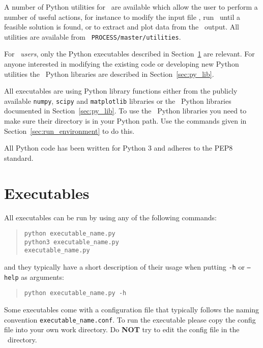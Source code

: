 \label{chap:utilities}

A number of Python utilities for \process\ are available which allow the user
to perform a number of useful actions, for instance to modify the
input file \indat, run \process\ until a feasible solution is found, or to
extract and plot data from the \process\ output. All utilities are available
from \texttt{~PROCESS/master/utilities}.

For \process\ \textit{users}, only the Python executables described in
Section~\ref{sec:py_exec} are relevant. For anyone interested in modifying the
existing code or developing new Python utilities the \process\ Python
libraries are described in Section~\ref{sec:py_lib}.

All executables are using Python library functions either from the publicly
available \texttt{numpy}, \texttt{scipy} and \texttt{matplotlib} libraries or
the \process\ Python libraries documented in Section~\ref{sec:py_lib}. To use
the \process\ Python libraries you need to make sure their directory is in
your Python path. Use the commands given in Section~\ref{sec:run_environment} to
do this.

All Python code has been written for Python 3 and adheres to the PEP8 standard.

\section{Executables}
\label{sec:py_exec}

All executables can be run by using any of the following commands:
\begin{quote}
\begin{verbatim}
python executable_name.py
python3 executable_name.py
executable_name.py
\end{verbatim}
\end{quote}
and they typically have a short description of their usage when putting
\texttt{-h} or \texttt{--help} as arguments:
\begin{quote}
\begin{verbatim}
python executable_name.py -h
\end{verbatim}
\end{quote}

Some executables come with a configuration file that typically follows the
naming convention \texttt{executable\_name.conf}. To run the executable please
copy the config file into your own work directory. Do \textbf{NOT} try to edit
the config file in the \process\ directory.

